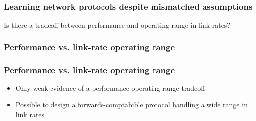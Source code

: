 \begin{frame}
\frametitle{Learning network protocols despite mismatched assumptions}
\begin{centering}
Is there a tradeoff between performance and operating range in link rates?
\end{centering}
\end{frame}


\begin{frame}
\frametitle{Performance vs. link-rate operating range}
\begin{centering}

\noindent {}

\end{centering}
\end{frame}

\begin{frame}
\frametitle{Performance vs. link-rate operating range}
\begin{itemize}
\item <2->{Only weak evidence of a performance-operating range tradeoff}
\item <3->{Possible to design a forwards-comptabible protocol handling a wide range in link rates}
\end{itemize}
\end{frame}
